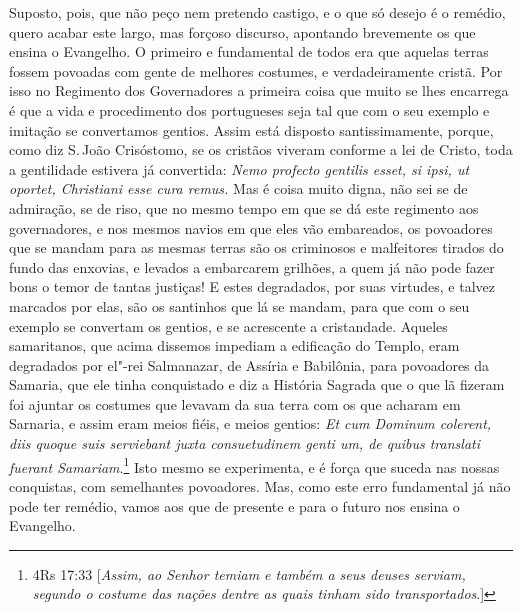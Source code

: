 Suposto, pois, que não peço nem pretendo castigo, e o que só desejo é o
remédio, quero acabar este largo, mas forçoso discurso, apontando
brevemente os que ensina o Evangelho. O primeiro e fundamental de todos
era que aquelas terras fossem povoadas com gente de melhores costumes, e
verdadeiramente cristã. Por isso no Regimento dos Governadores a
primeira coisa que muito se lhes encarrega é que a vida e procedimento
dos portugueses seja tal que com o seu exemplo e imitação se convertamos
gentios.
Assim está disposto santissimamente, porque, como diz S.\,João
Crisóstomo, se os cristãos viveram conforme a lei de Cristo, toda a
gentilidade estivera já convertida: \emph{Nemo profecto gentilis esset,
si ipsi, ut oportet, Christiani esse cura remus.} Mas é coisa muito
digna, não sei se de admiração, se de riso, que no mesmo tempo em que se
dá este regimento aos governadores, e nos mesmos navios em que eles vão
embareados, os povoadores que se mandam para as mesmas terras são os
criminosos e malfeitores tirados do fundo das enxovias, e levados a
embarcarem grilhões, a quem já não pode fazer bons o temor de tantas
justiças! E estes degradados, por suas virtudes, e talvez marcados por
elas, são os santinhos que lá se mandam, para que com o seu exemplo se
convertam os gentios, e se acrescente a cristandade. Aqueles
samaritanos, que acima dissemos impediam a edificação do Templo, eram
degradados por el"-rei Salmanazar, de Assíria e Babilônia, para
povoadores da Samaria, que ele tinha conquistado e diz a História
Sagrada que o que lã fizeram foi ajuntar os costumes que levavam da sua
terra com os que acharam em Sarnaria, e assim eram meios fiéis, e meios
gentios: \emph{Et cum Dominum colerent, diis quoque suis serviebant
juxta consuetudinem genti um, de quibus translati fuerant Samariam}.\footnote{4Rs 17:33 [\emph{Assim, ao Senhor temiam e também a seus deuses serviam, segundo o costume das
nações dentre as quais tinham sido transportados}.]}
Isto mesmo se experimenta, e é força que suceda nas nossas
conquistas, com semelhantes povoadores. Mas, como este erro fundamental
já não pode ter remédio, vamos aos que de presente e para o futuro nos
ensina o Evangelho.

